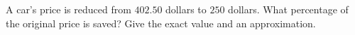 A car's price is reduced from $402.50$ dollars to $250$ dollars. What percentage of the original price is saved? Give the exact value and an approximation.
